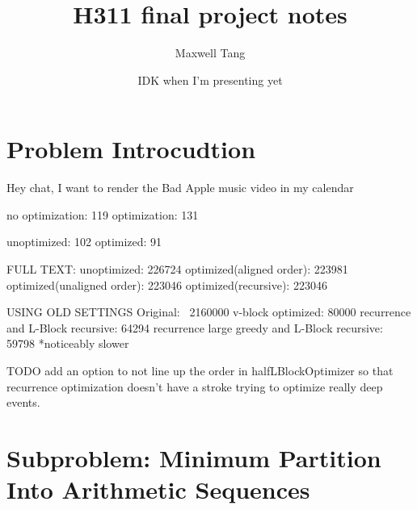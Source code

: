 \documentclass{article}
\title{H311 final project notes}
\author{Maxwell Tang}
\date{IDK when I'm presenting yet}
\begin{document}
\maketitle

\section*{Problem Introcudtion}
Hey chat, I want to render the Bad Apple music video in my calendar

no optimization: 119
optimization: 131

unoptimized: 102
optimized: 91

FULL TEXT:
unoptimized: 226724
optimized(aligned order): 223981
optimized(unaligned order): 223046
optimized(recursive): 223046

USING OLD SETTINGS
Original: ~2160000
v-block optimized: 80000
recurrence and L-Block recursive: 64294
recurrence large greedy and L-Block recursive: 59798
*noticeably slower

TODO add an option to not line up the order in halfLBlockOptimizer so that recurrence optimization doesn't have a stroke trying to optimize really deep events.

\section*{Subproblem: Minimum Partition Into Arithmetic Sequences}
\end{document}
